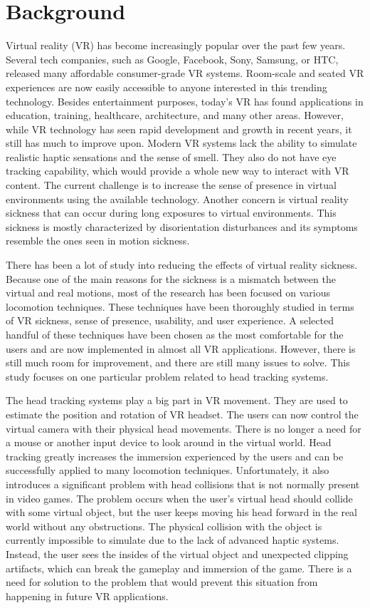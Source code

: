 \section{Background}

Virtual reality (VR) has become increasingly popular over the past few years. Several tech companies, such as Google, Facebook, Sony, Samsung, or HTC, released many affordable consumer-grade VR systems. Room-scale and seated VR experiences are now easily accessible to anyone interested in this trending technology. Besides entertainment purposes, today's VR has found applications in education, training, healthcare, architecture, and many other areas. However, while VR technology has seen rapid development and growth in recent years, it still has much to improve upon. Modern VR systems lack the ability to simulate realistic haptic sensations and the sense of smell. They also do not have eye tracking capability, which would provide a whole new way to interact with VR content. The current challenge is to increase the sense of presence in virtual environments using the available technology. Another concern is virtual reality sickness that can occur during long exposures to virtual environments. This sickness is mostly characterized by disorientation disturbances and its symptoms resemble the ones seen in motion sickness.

There has been a lot of study into reducing the effects of virtual reality sickness. Because one of the main reasons for the sickness is a mismatch between the virtual and real motions, most of the research has been focused on various locomotion techniques. These techniques have been thoroughly studied in terms of VR sickness, sense of presence, usability, and user experience. A selected handful of these techniques have been chosen as the most comfortable for the users and are now implemented in almost all VR applications. However, there is still much room for improvement, and there are still many issues to solve. This study focuses on one particular problem related to head tracking systems.

The head tracking systems play a big part in VR movement. They are used to estimate the position and rotation of VR headset. The users can now control the virtual camera with their physical head movements. There is no longer a need for a mouse or another input device to look around in the virtual world. Head tracking greatly increases the immersion experienced by the users and can be successfully applied to many locomotion techniques. Unfortunately, it also introduces a significant problem with head collisions that is not normally present in video games. The problem occurs when the user's virtual head should collide with some virtual object, but the user keeps moving his head forward in the real world without any obstructions. The physical collision with the object is currently impossible to simulate due to the lack of advanced haptic systems. Instead, the user sees the insides of the virtual object and unexpected clipping artifacts, which can break the gameplay and immersion of the game. There is a need for solution to the problem that would prevent this situation from happening in future VR applications.

